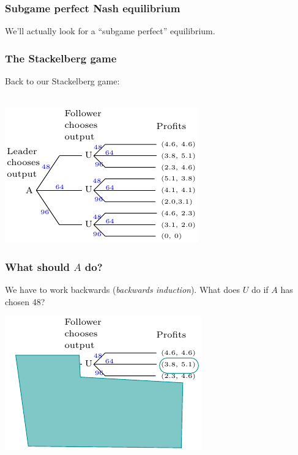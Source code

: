 \documentclass[xcolor=pdftex,dvipsnames]{beamer}
\begin{document}
\begin{frame}
  \frametitle{Subgame perfect Nash equilibrium}
  We'll actually look for a ``subgame perfect'' equilibrium.

\bigskip
{}

\bigskip
{}
\end{frame}



\begin{frame}
  \frametitle{The Stackelberg game}
Back to our Stackelberg game:\\
\

  \begin{center}
    \includegraphics{pics/Stackelberg}
  \end{center}

\end{frame}



\begin{frame}
  \frametitle{What should $A$ do?}
  We have to work backwards (\emph{backwards induction}).
What does $U$ do if $A$ has chosen 48?

  \begin{center}
    \includegraphics{pics/Stackelberg1}
  \end{center}

\end{frame}
\end{document}
